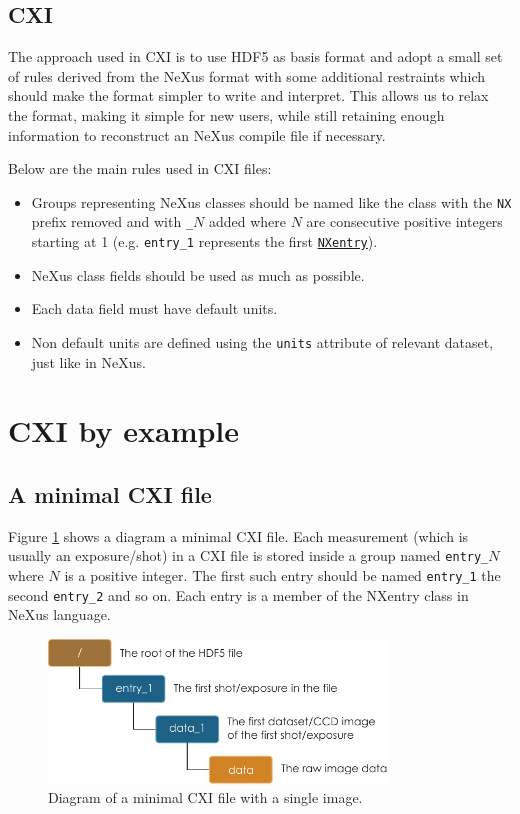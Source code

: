 \documentclass[usletter,11pt]{article}
\begin{document}
\subsection{CXI}

The approach used in CXI is to use HDF5 as basis format and adopt a small set of rules derived from the NeXus format with some additional restraints which should make the format simpler to write and interpret. This allows us to relax the format, making it simple for new users, while still retaining enough information to reconstruct an NeXus compile file if necessary.

Below are the main rules used in CXI files:
\begin{itemize}
\item{Groups representing NeXus classes should be named like the class
    with the {\tt NX} prefix removed and with {\tt \_$N$} added where
    $N$ are consecutive positive integers starting at 1
    (e.g. {\tt entry\_1} represents the first
    \hyperref[table:entry]{\tt NXentry}).}
\item{NeXus class fields should be used as much as possible.}
\item{Each data field must have default units.}
\item{Non default units are defined using the {\tt units} attribute of relevant dataset, just like in NeXus.} 
\end{itemize}

\clearpage
\section{CXI by example}
\subsection{A minimal CXI file}
Figure \ref{fig:minimal} shows a diagram a minimal CXI file. Each measurement (which is usually an exposure/shot) in a CXI file is stored inside a group named {\tt entry\_$N$} where $N$ is a positive integer. The first such entry should be named {\tt entry\_1} the second {\tt entry\_2} and so on. Each entry is a member of the NXentry class in NeXus language.

\begin{figure}[h!]
\centering
\includegraphics[width=0.8\textwidth]{minimal_cxi.pdf}
\caption{Diagram of a minimal CXI file with a single image.}
\label{fig:minimal}
\end{figure}
\end{document}

